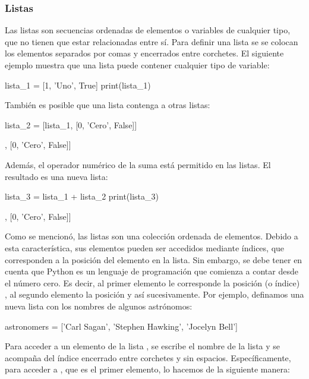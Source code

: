 \subsubsection{Listas}
Las listas son secuencias ordenadas de elementos o variables de cualquier tipo, que no tienen que estar relacionadas entre sí. Para definir una lista se se colocan los elementos separados por comas y encerrados entre corchetes. El siguiente ejemplo muestra que una lista puede contener cualquier tipo de variable:

\begin{pyin}
lista_1 = [1, 'Uno', True]
print(lista_1)
\end{pyin}
\begin{pyprint}
\end{pyprint}

También es posible que una lista contenga a otras listas:
\begin{pyin}
lista_2 = [lista_1, [0, 'Cero', False]]
\end{pyin}
\begin{pyprint}
[[1, 'Uno', True], [0, 'Cero', False]]
\end{pyprint}

Además, el operador numérico de la suma está permitido en las listas. El resultado es una nueva lista:
\begin{pyin}
lista_3 = lista_1 + lista_2
print(lista_3)
\end{pyin}
\begin{pyprint}
[1, 'Uno', True, [1, 'Uno', True], [0, 'Cero', False]]
\end{pyprint}

Como se mencionó, las listas son una colección ordenada de elementos. Debido a esta característica, sus elementos pueden ser accedidos mediante índices, que corresponden a la posición del elemento en la lista. Sin embargo, se debe tener en cuenta que Python es un lenguaje de programación que comienza a contar desde el número cero. Es decir, al primer elemento le corresponde la posición (o índice) , al segundo elemento la posición  y así sucesivamente. Por ejemplo, definamos una nueva lista con los nombres de algunos astrónomos:

\begin{pyin}
astronomers = ['Carl Sagan', 'Stephen Hawking', 'Jocelyn Bell']
\end{pyin}

Para acceder a un elemento de la lista , se escribe el nombre de la lista y se acompaña del índice encerrado entre corchetes y sin espacios. Específicamente, para acceder a , que es el primer elemento, lo hacemos de la siguiente manera:

